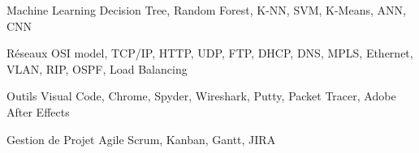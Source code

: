 \begin{cvskills}
\cvskill
    {Machine Learning} %
    {Decision Tree, Random Forest, K-NN, SVM, K-Means, ANN, CNN } %

 \cvskill
    {Réseaux} %
    {OSI model, TCP/IP, HTTP, UDP, FTP, DHCP, DNS, MPLS, Ethernet, VLAN, RIP, OSPF, Load Balancing   } %

\cvskill
    {Outils} %
    {Visual Code, Chrome, Spyder, Wireshark, Putty, Packet Tracer, Adobe After Effects  } %


\cvskill
    {Gestion de Projet} %
    {Agile Scrum, Kanban, Gantt, JIRA } %

\end{cvskills}
